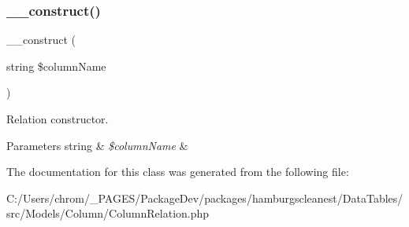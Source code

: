 \subsubsection{\texorpdfstring{\+\_\+\+\_\+construct()}{\_\_construct()}}
{\footnotesize\ttfamily \+\_\+\+\_\+construct (\begin{DoxyParamCaption}\item[{string}]{\$column\+Name }\end{DoxyParamCaption})}

Relation constructor. 
\begin{DoxyParams}[1]{Parameters}
string & {\em \$column\+Name} & \\
\hline
\end{DoxyParams}


The documentation for this class was generated from the following file\+:\begin{DoxyCompactItemize}
\item 
C\+:/\+Users/chrom/\+\_\+\+P\+A\+G\+E\+S/\+Package\+Dev/packages/hamburgscleanest/\+Data\+Tables/src/\+Models/\+Column/Column\+Relation.\+php\end{DoxyCompactItemize}
